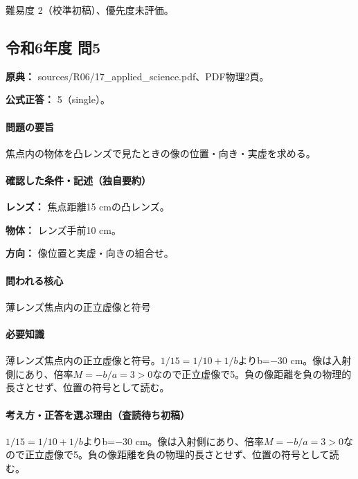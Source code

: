 \par 難易度 2（校準初稿）、優先度未評価。

\subsection{令和6年度 問5}
\label{q:r06-reg-applied-05}

\noindent\textbf{原典：} sources/R06/17\_applied\_science.pdf、PDF物理2頁。

\textbf{公式正答：} 5（single）。

\paragraph{問題の要旨} 焦点内の物体を凸レンズで見たときの像の位置・向き・実虚を求める。

\paragraph{確認した条件・記述（独自要約）}\mbox{}\par

\noindent\textbf{レンズ：} 焦点距離15 cmの凸レンズ。\par

\noindent\textbf{物体：} レンズ手前10 cm。\par

\noindent\textbf{方向：} 像位置と実虚・向きの組合せ。\par

\paragraph{問われる核心} 薄レンズ焦点内の正立虚像と符号

\paragraph{必要知識} 薄レンズ焦点内の正立虚像と符号。\(1/15=1/10+1/b\)よりb=−30 cm。像は入射側にあり、倍率\(M=-b/a=3>0\)なので正立虚像で5。負の像距離を負の物理的長さとせず、位置の符号として読む。

\paragraph{考え方・正答を選ぶ理由（査読待ち初稿）} \(1/15=1/10+1/b\)よりb=−30 cm。像は入射側にあり、倍率\(M=-b/a=3>0\)なので正立虚像で5。負の像距離を負の物理的長さとせず、位置の符号として読む。

